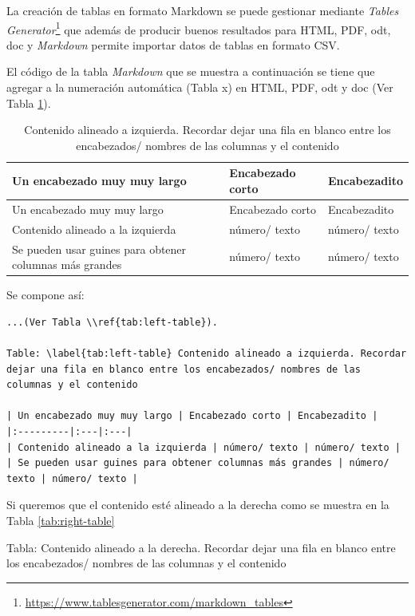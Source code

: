 \documentclass[
]{krantz}
\DeclareRobustCommand{\href}[2]{#2\footnote{\url{#1}}}
\begin{document}
La creación de tablas en formato Markdown se puede gestionar mediante \href{https://www.tablesgenerator.com/markdown_tables}{\emph{Tables Generator}} que además de producir buenos resultados para HTML, PDF, odt, doc y \emph{Markdown} permite importar datos de tablas en formato CSV.

El código de la tabla \emph{Markdown} que se muestra a continuación se tiene que agregar a la numeración automática (Tabla x) en HTML, PDF, odt y doc (Ver Tabla \ref{tab:left-table}).

\begin{longtable}[]{@{}
  >{\raggedright\arraybackslash}p{}
  >{\raggedright\arraybackslash}p{}
  >{\raggedright\arraybackslash}p{}@{}}
\caption{\label{tab:left-table} Contenido alineado a izquierda. Recordar dejar una fila en blanco entre los encabezados/ nombres de las columnas y el contenido}\tabularnewline
\toprule
Un encabezado muy muy largo & Encabezado corto & Encabezadito \\
\midrule
\endfirsthead
\toprule
Un encabezado muy muy largo & Encabezado corto & Encabezadito \\
\midrule
\endhead
Contenido alineado a la izquierda & número/ texto & número/ texto \\
Se pueden usar guines para obtener columnas más grandes & número/ texto & número/ texto \\
\bottomrule
\end{longtable}

Se compone así:

\begin{verbatim}
...(Ver Tabla \\ref{tab:left-table}).

Table: \label{tab:left-table} Contenido alineado a izquierda. Recordar dejar una fila en blanco entre los encabezados/ nombres de las columnas y el contenido

| Un encabezado muy muy largo | Encabezado corto | Encabezadito |
|:---------|:---|:---|
| Contenido alineado a la izquierda | número/ texto | número/ texto |
| Se pueden usar guines para obtener columnas más grandes | número/ texto | número/ texto |
\end{verbatim}

Si queremos que el contenido esté alineado a la derecha como se muestra en la Tabla \ref{tab:right-table}

Tabla: \label{tab:right-table} Contenido alineado a la derecha. Recordar dejar una fila en blanco entre los encabezados/ nombres de las columnas y el contenido
\end{document}
